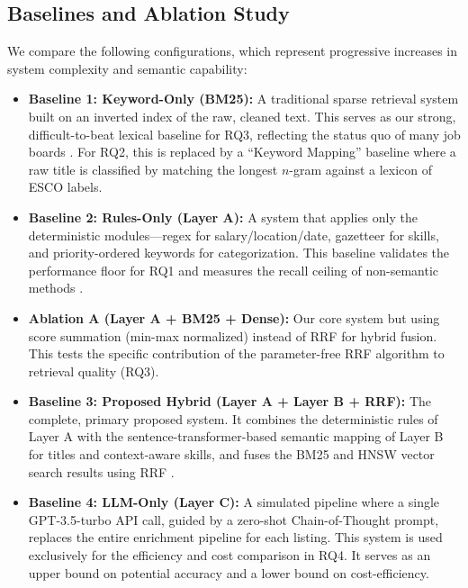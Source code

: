 \subsection{Baselines and Ablation Study}
We compare the following configurations, which represent progressive increases in system complexity and semantic capability:
\begin{itemize}
    \item \textbf{Baseline 1: Keyword-Only (BM25):} A traditional sparse retrieval system built on an inverted index of the raw, cleaned text. This serves as our strong, difficult-to-beat lexical baseline for RQ3, reflecting the status quo of many job boards \cite{robertson2009probabilistic}. For RQ2, this is replaced by a ``Keyword Mapping'' baseline where a raw title is classified by matching the longest \(n\)-gram against a lexicon of ESCO labels.

    \item \textbf{Baseline 2: Rules-Only (Layer A):} A system that applies only the deterministic modules---regex for salary/location/date, gazetteer for skills, and priority-ordered keywords for categorization. This baseline validates the performance floor for RQ1 and measures the recall ceiling of non-semantic methods \cite{sarawagi2008information}.

    \item \textbf{Ablation A (Layer A + BM25 + Dense):} Our core system but using score summation (min-max normalized) instead of RRF for hybrid fusion. This tests the specific contribution of the parameter-free RRF algorithm to retrieval quality (RQ3).

    \item \textbf{Baseline 3: Proposed Hybrid (Layer A + Layer B + RRF):} The complete, primary proposed system. It combines the deterministic rules of Layer A with the sentence-transformer-based semantic mapping of Layer B for titles and context-aware skills, and fuses the BM25 and HNSW vector search results using RRF \cite{reimers2019sentence, cormack2009reciprocal}.

    \item \textbf{Baseline 4: LLM-Only (Layer C):} A simulated pipeline where a single GPT-3.5-turbo API call, guided by a zero-shot Chain-of-Thought prompt, replaces the entire enrichment pipeline for each listing. This system is used exclusively for the efficiency and cost comparison in RQ4. It serves as an upper bound on potential accuracy and a lower bound on cost-efficiency.
\end{itemize}

